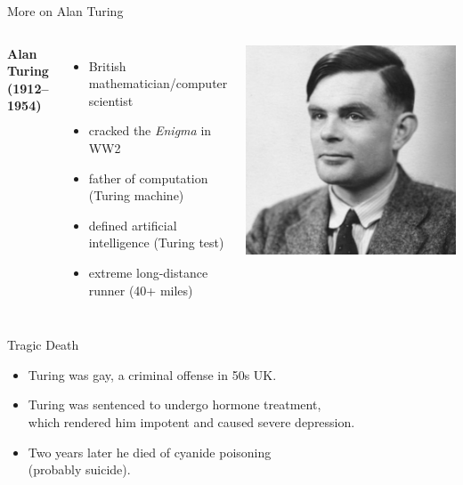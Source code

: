\documentclass[xcolor={usenames,svgnames,x11names,dvipsnames,table}]{beamer}
\begin{document}
\begin{frame}{More on Alan Turing}
    \begin{columns}
            \textbf{Alan Turing (1912--1954)}
            \begin{itemize}
                \item British mathematician\slash computer scientist
                \item cracked the \emph{Enigma} in WW2
                \item father of computation (Turing machine)
                \item defined artificial intelligence (Turing test)
                \item extreme long-distance runner (40+ miles)
            \end{itemize}
        \includegraphics[width=1\linewidth]{./img/turing}
    \end{columns}

    \medskip
    \begin{block}{Tragic Death}
        \begin{itemize}
            \item Turing was gay, a criminal offense in 50s UK.
            \item Turing was sentenced to undergo hormone treatment,\\
                which rendered him impotent and caused severe depression.
            \item Two years later he died of cyanide poisoning\\
                (probably suicide).
        \end{itemize}
    \end{block}
\end{frame}
\end{document}
